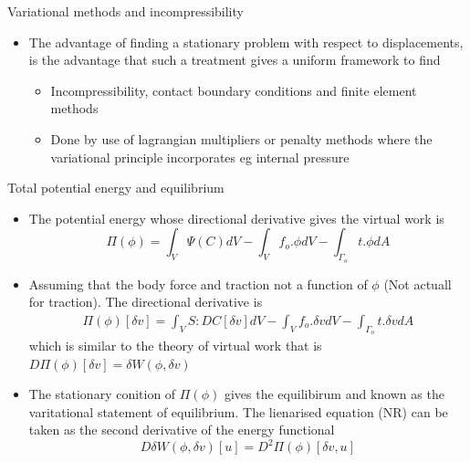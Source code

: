	\begin{frame}{Variational methods and incompressibility}
	\begin{itemize}
			\item 	The advantage of finding a stationary problem with respect to displacements, is the advantage that such a treatment gives a uniform framework to find
				\begin{itemize}
					\item Incompressibility, contact boundary conditions and finite element methods
					\item Done by use of lagrangian multipliers or penalty methods where the variational principle incorporates eg internal pressure
				\end{itemize}
	\end{itemize}
	\end{frame}

	\begin{frame}{Total potential energy and equilibrium}
		\begin{itemize}
			\item The potential energy whose directional derivative gives the virtual work is
			\begin{equation}
				\Pi(\phi) = \int_V \Psi(C) dV - \int_V f_o. \phi dV - \int_{\Gamma_o} t.\phi dA
			\end{equation}
			\item Assuming that the body force and traction not a function of $\phi$ (Not actuall for traction). The directional derivative is
			\begin{equation}
			\begin{aligned}
			\Pi(\phi)[\delta v] = \int_V S : DC[\delta v]dV - \int_V f_o. \delta v dV - \int_{\Gamma_o} t.\delta vdA
			\end{aligned}
			\end{equation}
			which is similar to the theory of virtual work that is $D\Pi(\phi)[\delta v] = \delta W(\phi,\delta v)$
		\end{itemize}
		\begin{block}{}
			\begin{itemize}
				\item The stationary conition of $\Pi(\phi)$ gives the equilibirum and known as the varitational statement of equilibrium. The lienarised equation (NR) can be taken as the second derivative of the energy functional
				\begin{equation}
					D\delta W(\phi,\delta v)[u] = D^2 \Pi(\phi)[\delta v, u]
				\end{equation}
				\end{itemize}
		\end{block}
	\end{frame}

